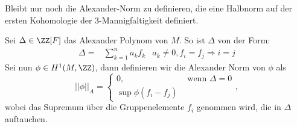 
    	Bleibt nur noch die Alexander-Norm zu definieren, die eine Halbnorm auf der ersten Kohomologie der 3-Mannigfaltigkeit definiert.
    	\begin{defn}
    		Sei  $\Delta \in \ZZ [F]$ das Alexander Polynom von $M$. So ist $\Delta$ von der Form:
    		\begin{align*}
    		    			\Delta = &\sum_{k=1}^n a_k f_k& a_k \neq 0, f_i = f_j \Rightarrow i=j
    		\end{align*}
    		Sei nun $\phi \in H^1 (M,\ZZ)$, dann definieren wir die Alexander Norm von $\phi$ als
    		\[
    			||\phi||_A = \begin{cases}
    				0 , &\text{ wenn } \Delta=0\\
    				\sup \phi (f_i - f_j) &
    			\end{cases},
    		\]
    		wobei das Supremum über die Gruppenelemente $f_i$ genommen wird, die in $\Delta$ auftauchen.

    	\end{defn}

